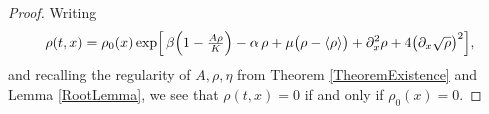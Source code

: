 \documentclass[10pt,a4paper]{amsart}
\begin{document}
\begin{proof}
	Writing
\[
\rho(t,x)
= \rho_0(x)\exp\Bigl[\,
\beta\Bigl(1-\tfrac{A\rho}{K}\Bigr)
-\alpha\,\rho
+\mu\bigl(\rho-\langle\rho\rangle\bigr)
+\partial_x^2\rho
+4\bigl(\partial_x\sqrt{\rho}\bigr)^2
\Bigr],
\]
and recalling the regularity of $A,\rho,\eta$ from Theorem \ref{TheoremExistence} and Lemma \ref{RootLemma}, we see that
$\rho(t,x)=0$ if and only if $\rho_0(x)=0$.
\end{proof}
\end{document}
